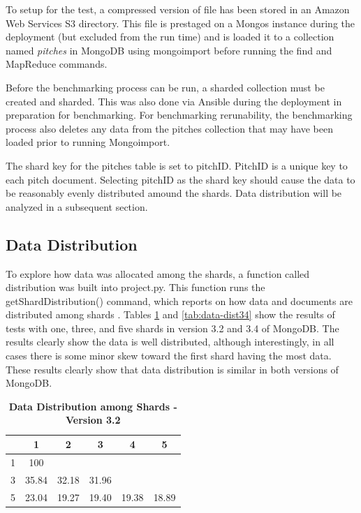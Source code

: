 \documentclass[9pt,twocolumn,twoside]{../../styles/osajnl}
\begin{document}
To setup for the test, a compressed version of file has been stored in an Amazon Web Services S3 directory.  This file is prestaged on a Mongos instance during the deployment (but excluded from the run time) and is loaded it to a collection named \emph{pitches} in MongoDB using mongoimport before running the find and MapReduce commands.


Before the benchmarking process can be run, a sharded collection must be created and sharded.  This was also done via Ansible during the deployment in preparation for benchmarking.  For benchmarking rerunability, the benchmarking process also deletes any data from the pitches collection that may have been loaded prior to running Mongoimport.


The shard key for the pitches table is set to pitchID.  PitchID is a unique key to each pitch document.  Selecting pitchID as the shard key should cause the data to be reasonably evenly distributed amound the shards.  Data distribution will be analyzed in a subsequent section.




\subsection{Data Distribution}

To explore how data was allocated among the shards, a function called distribution was built into project.py.  This function runs the getShardDistribution() command, which reports on how data and documents are distributed among shards \cite{www-shardDist}.  Tables \ref{tab:data-dist32} and \ref{tab:data-dist34} show the results of tests with one, three, and five shards in version 3.2 and 3.4 of MongoDB.  The results clearly show the data is well distributed, although interestingly, in all cases there is some minor skew toward the first shard having the most data. These results clearly show that data distribution is similar in both versions of MongoDB.


\begin{table}[htbp]
\centering
\caption{\bf Data Distribution among Shards - Version 3.2}

 \begin{tabular}{| c | c | c | c | c | c |} 
 \hline
  &  1    &  2    &  3    &   4   & 5 \\ [0.5ex]
\hline
  \hline
1 & 100   &       &       &       &   \\
\hline
3 & 35.84 & 32.18 & 31.96 &       &   \\
\hline
5 & 23.04 & 19.27 & 19.40 & 19.38 & 18.89   \\
\hline
\end{tabular}
  \label{tab:data-dist32}
\end{table}
\end{document}
